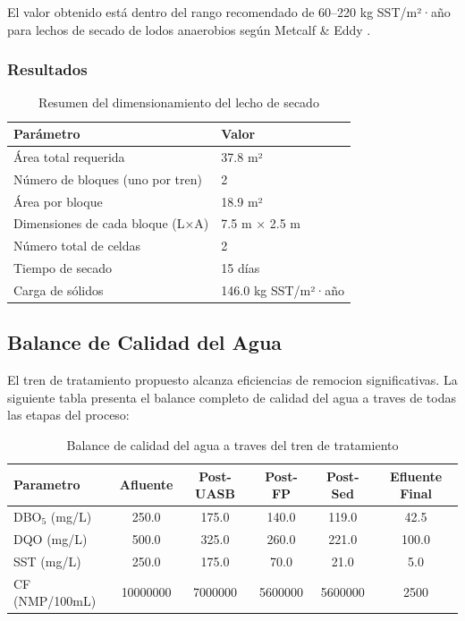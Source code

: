 \documentclass[12pt,a4paper]{article}
\begin{document}
El valor obtenido está dentro del rango recomendado de 60--220 kg SST/m²·año para lechos de secado de lodos anaerobios según Metcalf \& Eddy \cite{metcalf2014}.

\subsubsection{Resultados}

\begin{table}[H]
\centering
\caption{Resumen del dimensionamiento del lecho de secado}
\begin{tabular}{ll}
\toprule
Parámetro & Valor \\
\midrule
Área total requerida & 37.8 m² \\
Número de bloques (uno por tren) & 2 \\
Área por bloque & 18.9 m² \\
Dimensiones de cada bloque (L×A) & 7.5 m × 2.5 m \\
Número total de celdas & 2 \\
Tiempo de secado & 15 días \\
Carga de sólidos & 146.0 kg SST/m²·año \\
\bottomrule
\end{tabular}
\end{table}

\subsection{Balance de Calidad del Agua}

El tren de tratamiento propuesto alcanza eficiencias de remocion significativas. La siguiente tabla presenta el balance completo de calidad del agua a traves de todas las etapas del proceso:

\begin{table}[H]
\centering
\caption{Balance de calidad del agua a traves del tren de tratamiento}
\begin{tabular}{lccccc}
\toprule
Parametro & Afluente & Post-UASB & Post-FP & Post-Sed & Efluente Final \\
\midrule
DBO$_5$ (mg/L) & 250.0 & 175.0 & 140.0 & 119.0 & 42.5 \\
DQO (mg/L) & 500.0 & 325.0 & 260.0 & 221.0 & 100.0 \\
SST (mg/L) & 250.0 & 175.0 & 70.0 & 21.0 & 5.0 \\
CF (NMP/100mL) & 10000000 & 7000000 & 5600000 & 5600000 & 2500 \\
\bottomrule
\end{tabular}
\end{table}
\end{document}
